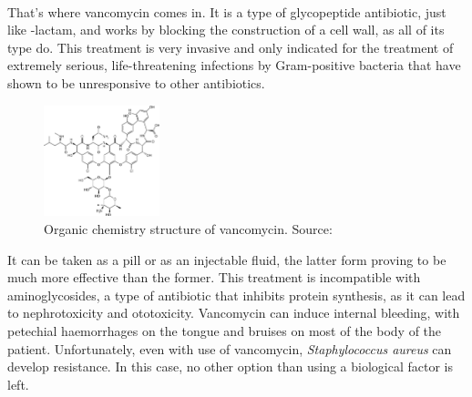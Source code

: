 \paragraph{}That's where vancomycin comes in. It is a type of glycopeptide antibiotic, just like \beta-lactam, and works by blocking the construction of a cell wall, as all of its type do. This treatment is very invasive and only indicated for the treatment of extremely serious, life-threatening infections by Gram-positive bacteria that have shown to be unresponsive to other antibiotics.\begin{figure}\begin{center}\includegraphics[width=0.30\textwidth]{assets/vancomycin.png}\end{center}\caption{Organic chemistry structure of vancomycin. Source: \cite{FileVancomycinSvg2008}}\vspace{0.15\linewidth}\end{figure}\newline It can be taken as a pill or as an injectable fluid, the latter form proving to be much more effective than the former. This treatment is incompatible with aminoglycosides, a type of antibiotic that inhibits protein synthesis, as it can lead to nephrotoxicity and ototoxicity. Vancomycin can induce  internal bleeding, with petechial haemorrhages on the tongue and bruises on most of the body of the patient. Unfortunately, even with use of vancomycin, \emph{Staphylococcus aureus} can develop resistance. In this case, no other option than using a biological factor is left.
